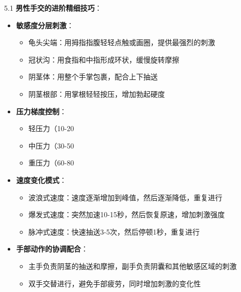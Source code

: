 \documentclass[12pt,UTF8]{ctexbook}
\begin{document}
5.1 \textbf{男性手交的进阶精细技巧}：
\begin{itemize}
	\item \textbf{敏感度分层刺激}：
	\begin{itemize}
		\item 龟头尖端：用拇指指腹轻轻点触或画圈，提供最强烈的刺激
		\item 冠状沟：用食指和中指形成环状，缓慢旋转摩擦
		\item 阴茎体：用整个手掌包裹，配合上下抽送
		\item 阴茎根部：用掌根轻轻按压，增加勃起硬度
	\end{itemize}
	\item \textbf{压力梯度控制}：
	\begin{itemize}
		\item 轻压力（10-20%
		\item 中压力（30-50%
		\item 重压力（60-80%
	\end{itemize}
	\item \textbf{速度变化模式}：
	\begin{itemize}
		\item 波浪式速度：速度逐渐增加到峰值，然后逐渐降低，重复进行
		\item 爆发式速度：突然加速10-15秒，然后恢复原速，增加刺激强度
		\item 脉冲式速度：快速抽送3-5次，然后停顿1秒，重复进行
	\end{itemize}
	\item \textbf{手部动作的协调配合}：
	\begin{itemize}
		\item 主手负责阴茎的抽送和摩擦，副手负责阴囊和其他敏感区域的刺激
		\item 双手交替进行，避免手部疲劳，同时增加刺激的变化性
	\end{itemize}
\end{itemize}
\end{document}
